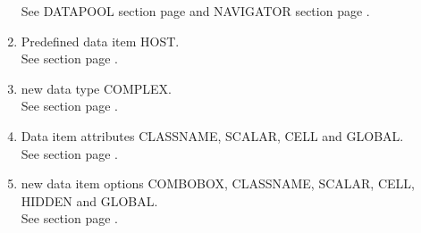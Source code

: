 \begin{enumerate}
See DATAPOOL section  page \pageref{dia:dataitemoptions} and 
NAVIGATOR section  page \pageref{sec:uinavigator}. \\
\item Predefined data item HOST. \\
See section  page \pageref{dataitempredefined}. \\
\item new data type COMPLEX. \\
See section  page \pageref{sec:dpitem}. \\
\item Data item attributes CLASSNAME, SCALAR, CELL and GLOBAL. \\
See section  page \pageref{dataitemattributes}. \\
\item new data item options COMBOBOX, CLASSNAME, SCALAR, CELL, HIDDEN and GLOBAL. \\
See section  page \pageref{dia:dataitemoptions}. \\
\end{enumerate}
